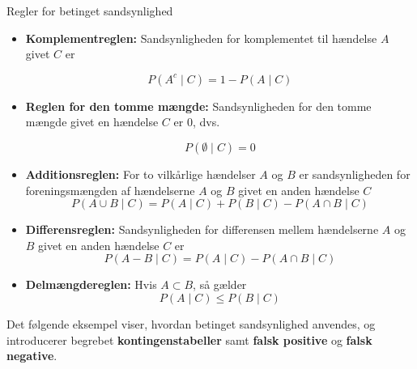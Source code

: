\begin{theorem}{Regler for betinget sandsynlighed}
    \begin{itemize}
        \item \textbf{Komplementreglen:} Sandsynligheden for komplementet til hændelse $A$ givet $C$ er
    
        \[
        P\left(A^c \mid C\right)=1-P(A \mid C)
        \]

        \item \textbf{Reglen for den tomme mængde:} Sandsynligheden for den tomme mængde givet en hændelse $C$ er 0, dvs.
        
        \[P(\emptyset \mid C) = 0\]
        
        \item \textbf{Additionsreglen:} For to vilkårlige hændelser $A$ og $B$ er sandsynligheden for foreningsmængden af hændelserne $A$ og $B$ givet en anden hændelse $C$
        \[
        P(A \cup B \mid C)=P(A \mid C)+P(B \mid C)-P(A \cap B \mid C)
        \]

        \item \textbf{Differensreglen:} Sandsynligheden for differensen mellem hændelserne $A$ og $B$ givet en anden hændelse $C$ er
        \[
            P(A-B \mid C)=P(A \mid C)-P(A \cap B \mid C)
        \]
        \item \textbf{Delmængdereglen:} Hvis $A \subset B$, så gælder
        \[
        P(A \mid C) \leq P(B \mid C)
        \]
    \end{itemize}
\end{theorem}

Det følgende eksempel viser, hvordan betinget sandsynlighed anvendes, og introducerer begrebet \textbf{kontingenstabeller} samt \textbf{falsk positive} og \textbf{falsk negative}.

